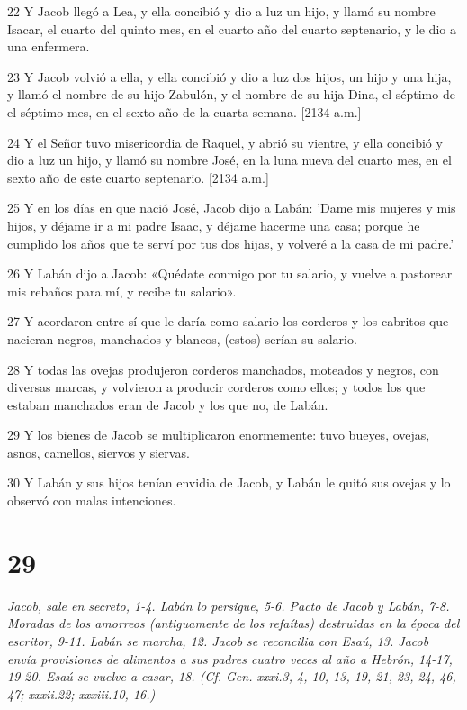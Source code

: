 \par 22 Y Jacob llegó a Lea, y ella concibió y dio a luz un hijo, y llamó su nombre Isacar, el cuarto del quinto mes, en el cuarto año del cuarto septenario, y le dio a una enfermera.
\par 23 Y Jacob volvió a ella, y ella concibió y dio a luz dos hijos, un hijo y una hija, y llamó el nombre de su hijo Zabulón, y el nombre de su hija Dina, el séptimo de el séptimo mes, en el sexto año de la cuarta semana. [2134 a.m.]
\par 24 Y el Señor tuvo misericordia de Raquel, y abrió su vientre, y ella concibió y dio a luz un hijo, y llamó su nombre José, en la luna nueva del cuarto mes, en el sexto año de este cuarto septenario. [2134 a.m.]
\par 25 Y en los días en que nació José, Jacob dijo a Labán: 'Dame mis mujeres y mis hijos, y déjame ir a mi padre Isaac, y déjame hacerme una casa; porque he cumplido los años que te serví por tus dos hijas, y volveré a la casa de mi padre.'
\par 26 Y Labán dijo a Jacob: «Quédate conmigo por tu salario, y vuelve a pastorear mis rebaños para mí, y recibe tu salario».
\par 27 Y acordaron entre sí que le daría como salario los corderos y los cabritos que nacieran negros, manchados y blancos, (estos) serían su salario.
\par 28 Y todas las ovejas produjeron corderos manchados, moteados y negros, con diversas marcas, y volvieron a producir corderos como ellos; y todos los que estaban manchados eran de Jacob y los que no, de Labán.
\par 29 Y los bienes de Jacob se multiplicaron enormemente: tuvo bueyes, ovejas, asnos, camellos, siervos y siervas.
\par 30 Y Labán y sus hijos tenían envidia de Jacob, y Labán le quitó sus ovejas y lo observó con malas intenciones.

\chapter{29}

\par \textit{Jacob, sale en secreto, 1-4. Labán lo persigue, 5-6. Pacto de Jacob y Labán, 7-8. Moradas de los amorreos (antiguamente de los refaítas) destruidas en la época del escritor, 9-11. Labán se marcha, 12. Jacob se reconcilia con Esaú, 13. Jacob envía provisiones de alimentos a sus padres cuatro veces al año a Hebrón, 14-17, 19-20. Esaú se vuelve a casar, 18. (Cf. Gen. xxxi.3, 4, 10, 13, 19, 21, 23, 24, 46, 47; xxxii.22; xxxiii.10, 16.)}

